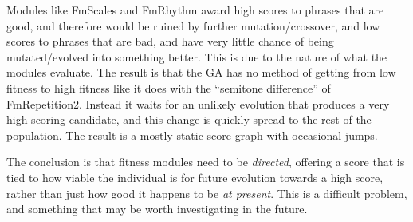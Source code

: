 Modules like FmScales and FmRhythm award high scores to phrases that are good, and therefore would be ruined by further mutation/crossover, and low scores to phrases that are bad, and have very little chance of being mutated/evolved into something better. This is due to the nature of what the modules evaluate. The result is that the GA has no method of getting from low fitness to high fitness like it does with the ``semitone difference'' of FmRepetition2. Instead it waits for an unlikely evolution that produces a very high-scoring candidate, and this change is quickly spread to the rest of the population. The result is a mostly static score graph with occasional jumps.

The conclusion is that fitness modules need to be \emph{directed}, offering a score that is tied to how viable the individual is for future evolution towards a high score, rather than just how good it happens to be \emph{at present}. This is a difficult problem, and something that may be worth investigating in the future.
